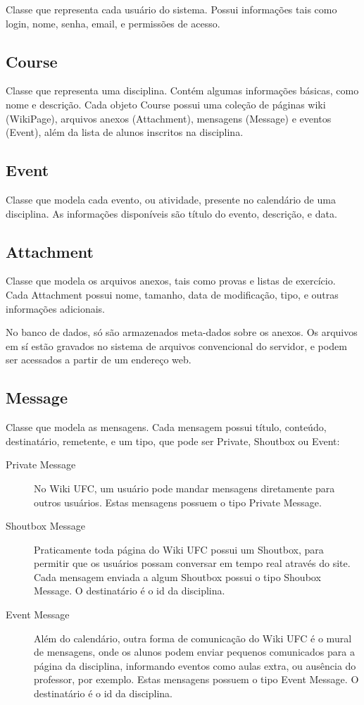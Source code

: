 \documentclass[11pt]{article}
\begin{document}
Classe que representa cada usuário do sistema. Possui informações tais como login, nome, senha,
email, e permissões de acesso.

\subsection{Course}

Classe que representa uma disciplina. Contém algumas informações básicas, como nome e descrição.
Cada objeto Course possui uma coleção de páginas wiki (WikiPage), arquivos anexos (Attachment),
mensagens (Message) e eventos (Event), além da lista de alunos inscritos na disciplina.

\subsection{Event}

Classe que modela cada evento, ou atividade, presente no calendário de uma disciplina. As
informações disponíveis são título do evento, descrição, e data.

\subsection{Attachment}

Classe que modela os arquivos anexos, tais como provas e listas de exercício. Cada Attachment possui
nome, tamanho, data de modificação, tipo, e outras informações adicionais.

No banco de dados, só são armazenados meta-dados sobre os anexos. Os arquivos em sí estão
gravados no sistema de arquivos convencional do servidor, e podem ser acessados a partir de um
endereço web.

\subsection{Message}

Classe que modela as mensagens. Cada mensagem possui título, conteúdo, destinatário, remetente, e um
tipo, que pode ser Private, Shoutbox ou Event:

\begin{description}
	\item[Private Message] No Wiki UFC, um usuário pode mandar mensagens diretamente para outros
	usuários. Estas mensagens possuem o tipo Private Message.

	\item[Shoutbox Message] Praticamente toda página do Wiki UFC possui um Shoutbox, para permitir
	que os usuários possam conversar em tempo real através do site. Cada mensagem enviada a algum
	Shoutbox possui o tipo Shoubox Message. O destinatário é o id da disciplina.

	\item[Event Message] Além do calendário, outra forma de comunicação do Wiki UFC é o mural de
	mensagens, onde os alunos podem enviar pequenos comunicados para a página da disciplina,
	informando eventos como aulas extra, ou ausência do professor, por exemplo. Estas mensagens
	possuem o tipo Event Message. O destinatário é o id da disciplina.
\end{description}
\end{document}
